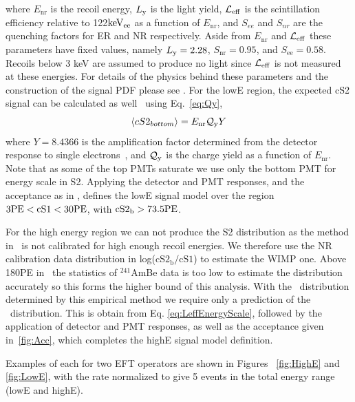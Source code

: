 where $E_\mathrm{nr}$ is the recoil energy, $L_{\mathrm{y}}$ is the light yield, $\mathcal{L}_{\mathrm{eff}}$ is the scintillation efficiency relative to 122$\mathrm{keV_{ee}}$ as a function of $E_\mathrm{nr}$, and $S_{ee}$ and $S_{nr}$ are the quenching factors for ER and NR respectively. Aside from $E_\mathrm{nr}$ and $\mathcal{L}_{\mathrm{eff}}$ these parameters have fixed values, namely $L_{\mathrm{y}} = 2.28$, $S_\mathrm{nr} = 0.95$, and $S_\mathrm{ee} = 0.58$. Recoils below 3 keV are assumed to produce no light since $\mathcal{L}_{\mathrm{eff}}$ is not measured at these energies. For details of the physics behind these parameters and the construction of the signal PDF please see \cite{xe100_ana2012,xe100_run_combination}. For the lowE region, the expected cS2 signal can be calculated as well~\cite{DataMCXenon} using Eq.~\ref{eq:Qy},
%
\begin{equation}
\label{eq:Qy}
	\langle cS2_{bottom} \rangle = E_{\mathrm{nr}}\mathcal{Q}_{\mathrm{y}} Y   
\end{equation}
%
where $Y = 8.4366$ is the amplification factor determined from the detector response to single electrons~\cite{XenonSingleElectron}, and $\mathcal{Q}_{\mathrm{y}}$ is the charge yield as a function of $E_\mathrm{nr}$. Note that as some of the top PMTs saturate we use only the bottom PMT for energy scale in S2.  Applying the detector and PMT responses, and the acceptance as in \cite{xe100_run_combination}, defines the lowE signal model over the region $3 \mathrm{PE} < \mathrm{cS1} < 30 \mathrm{PE}$, with $\mathrm{cS2}_\mathrm{b} > 73.5 \mathrm{PE}$.

For the high energy region we can not produce the S2 distribution as the method in~\cite{DataMCXenon} is not calibrated for high enough recoil energies. We therefore use the NR calibration data distribution in log($\mathrm{cS2_b/cS1}$) to estimate the WIMP one. Above 180PE in \cSi\ the statistics of $^{241}$AmBe data is too low to estimate the distribution accurately so this forms the higher bound of this analysis. With the \cSiib\ distribution determined by this empirical method we require only a prediction of the \cSi\ distribution. This is obtain from Eq. \ref{eq:LeffEnergyScale}, followed by the application of detector and PMT responses, as well as the acceptance given in~\ref{fig:Acc}, which completes the highE signal model definition.

Examples of each for two EFT operators are shown in Figures ~\ref{fig:HighE} and \ref{fig:LowE}, with the rate normalized to give 5 events in the total energy range (lowE and highE).

